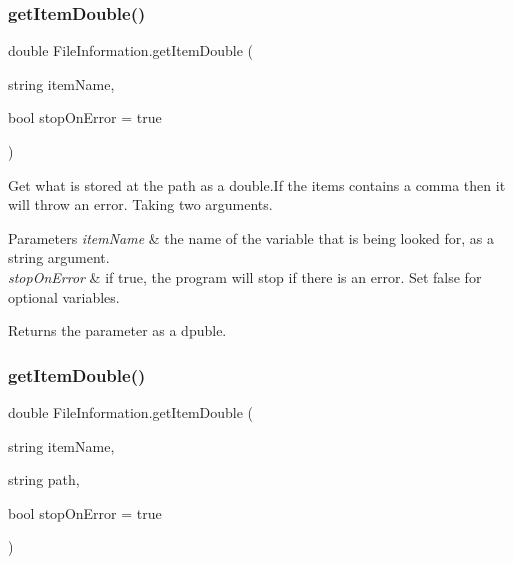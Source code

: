\subsubsection{\texorpdfstring{getItemDouble()}{getItemDouble()}\hspace{0.1cm}{\footnotesize\ttfamily [1/2]}}
{\footnotesize\ttfamily double File\+Information.\+get\+Item\+Double (\begin{DoxyParamCaption}\item[{string}]{item\+Name,  }\item[{bool}]{stop\+On\+Error = {\ttfamily true} }\end{DoxyParamCaption})\hspace{0.3cm}{\ttfamily [inline]}}



Get what is stored at the path as a double.\+If the items contains a comma then it will throw an error. Taking two arguments. 


\begin{DoxyParams}{Parameters}
{\em item\+Name} & the name of the variable that is being looked for, as a string argument. \\
\hline
{\em stop\+On\+Error} & if true, the program will stop if there is an error. Set false for optional variables. \\
\hline
\end{DoxyParams}
\begin{DoxyReturn}{Returns}
the parameter as a dpuble. 
\end{DoxyReturn}
\mbox{\label{class_file_information_a7663ef7e1872b1dc1004c2282cccf04c}} 
\subsubsection{\texorpdfstring{getItemDouble()}{getItemDouble()}\hspace{0.1cm}{\footnotesize\ttfamily [2/2]}}
{\footnotesize\ttfamily double File\+Information.\+get\+Item\+Double (\begin{DoxyParamCaption}\item[{string}]{item\+Name,  }\item[{string}]{path,  }\item[{bool}]{stop\+On\+Error = {\ttfamily true} }\end{DoxyParamCaption})\hspace{0.3cm}{\ttfamily [inline]}}



